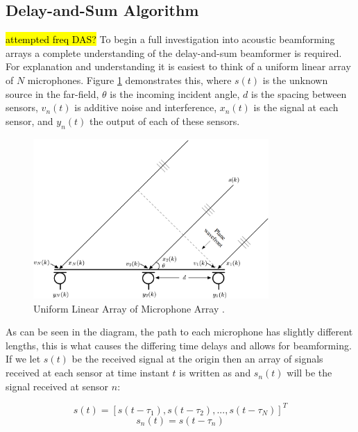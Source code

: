 \documentclass{UoNMCHA}
\numberwithin{equation}{section}
\begin{document}
\subsection{Delay-and-Sum Algorithm} \label{sec:Software DAS}
    \hl{attempted freq DAS?}
    To begin a full investigation into acoustic beamforming arrays a complete understanding of the delay-and-sum beamformer is required. For explanation and understanding it is easiest to think of a uniform linear array of $N$ microphones. Figure \ref{fig:ULA} demonstrates this, where $s(t)$ is the unknown source in the far-field, $\theta$ is the incoming incident angle, $d$ is the spacing between sensors, $v_n(t)$ is additive noise and interference, $x_n(t)$ is the signal at each sensor, and $y_n(t)$ the output of each of these sensors.
    
    \begin{figure} [H]
        \centering
        \includegraphics[keepaspectratio, width = 0.8\textwidth]{Figures/ULA.png}
        \caption{Uniform Linear Array of Microphone Array \citep{Ben08}.}
        \label{fig:ULA}
    \end{figure}
    
    As can be seen in the diagram, the path to each microphone has slightly different lengths, this is what causes the differing time delays and allows for beamforming. If we let $s(t)$ be the received signal at the origin then an array of signals received at each sensor at time instant $t$ is written as and $s_n(t)$ will be the signal received at sensor $n$:
    
    \begin{equation}
        s(t) = [s(t-\tau_1), s(t-\tau_2), ..., s(t-\tau_N)]^T
        \label{eq:signal array}
    \end{equation}
    \begin{equation}
        s_n(t) = s(t-\tau_n)
        \label{eq:sensor signal}
    \end{equation}
    
\end{document}
